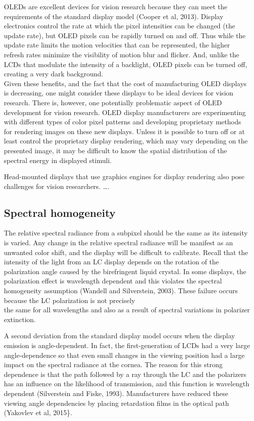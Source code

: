 \documentclass[
  letterpaper,
]{book}
\begin{document}
OLEDs are excellent devices for vision research because they can meet
the requirements of the standard display model (Cooper et al, 2013).
Display electronics control the rate at which the pixel intensities can
be changed (the update rate), but OLED pixels can be rapidly turned on
and off. Thus while the update rate limits the motion velocities that
can be represented, the higher refresh rates minimize the visibility of
motion blur and flicker. And, unlike the LCDs that modulate the
intensity of a backlight, OLED pixels can be turned off, creating a very
dark background.\\
Given these benefits, and the fact that the cost of manufacturing OLED
displays is decreasing, one might consider these displays to be ideal
devices for vision research. There is, however, one potentially
problematic aspect of OLED development for vision research. OLED display
manufacturers are experimenting with different types of color pixel
patterns and developing proprietary methods for rendering images on
these new displays. Unless it is possible to turn off or at least
control the proprietary display rendering, which may vary depending on
the presented image, it may be difficult to know the spatial
distribution of the spectral energy in displayed stimuli.

Head-mounted displays that use graphics engines for display rendering
also pose challenges for vision researchers. \ldots.

\subsection{Spectral homogeneity}\label{spectral-homogeneity}

The relative spectral radiance from a subpixel should be the same as its
intensity is varied. Any change in the relative spectral radiance will
be manifest as an unwanted color shift, and the display will be
difficult to calibrate. Recall that the intensity of the light from an
LC display depends on the rotation of the polarization angle caused by
the birefringent liquid crystal. In some displays, the polarization
effect is wavelength dependent and this violates the spectral
homogeneity assumption (Wandell and Silverstein, 2003). These failure
occurs because the LC polarization is not precisely\\
the same for all wavelengths and also as a result of spectral variations
in polarizer extinction.

A second deviation from the standard display model occurs when the
display emission is angle-dependent. In fact, the first-generation of
LCDs had a very large angle-dependence so that even small changes in the
viewing position had a large impact on the spectral radiance at the
cornea. The reason for this strong dependence is that the path followed
by a ray through the LC and the polarizers has an influence on the
likelihood of transmission, and this function is wavelength dependent
(Silverstein and Fiske, 1993). Manufacturers have reduced these viewing
angle dependencies by placing retardation films in the optical path
(Yakovlev et al, 2015\}.
\end{document}
